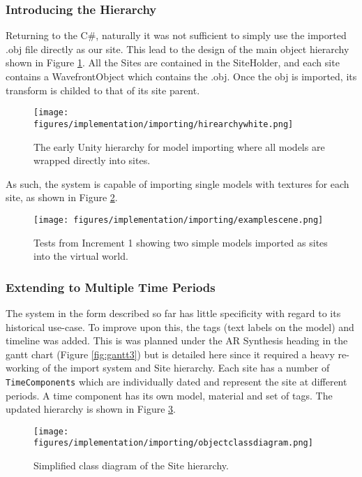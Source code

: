 \documentclass{article}
\begin{document}
\subsubsection{Introducing the Hierarchy}
Returning to the C\#, naturally it was not sufficient to simply use the imported .obj file directly as our site. This lead to the design of the main object hierarchy shown in Figure \ref{fig:initialhirearchy}. All the Sites are contained in the SiteHolder, and each \gls{site} contains a WavefrontObject which contains the .obj. Once the obj is imported, its transform is childed to that of its site parent.

\begin{figure}[h]
    \centering
    \texttt{[image: figures/implementation/importing/hirearchywhite.png]}
        \caption{The early Unity hierarchy for model importing where all models are wrapped directly into sites.}
        \label{fig:initialhirearchy}
\end{figure}

As such, the system is capable of importing single models with textures for each site, as shown in Figure \ref{fig:earlyimportedscene}.

\begin{figure}[h]
    \centering
    \texttt{[image: figures/implementation/importing/examplescene.png]}
        \caption{Tests from Increment 1 showing two simple models imported as sites into the virtual world.}
        \label{fig:earlyimportedscene}
\end{figure}

\subsubsection{Extending to Multiple Time Periods}
The system in the form described so far has little specificity with regard to its historical use-case. To improve upon this, the tags (text labels on the model) and timeline was added. This is was planned under the AR Synthesis heading in the gantt chart (Figure \ref{fig:gantt3}) but is detailed here since it required a heavy re-working of the import system and Site hierarchy. Each site has a number of \verb|TimeComponents| which are individually dated and represent the site at different periods. A time component has its own model, material and set of tags. The updated hierarchy is shown in Figure \ref{fig:hierarchydiagram}.

\begin{figure}[h]
    \centering
    \texttt{[image: figures/implementation/importing/objectclassdiagram.png]}
        \caption{Simplified class diagram of the Site hierarchy.}
        \label{fig:hierarchydiagram}
\end{figure}
\end{document}
